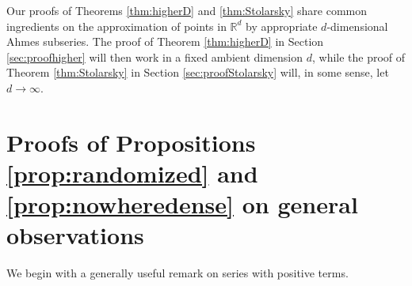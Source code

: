 \documentclass[11pt,letterpaper,reqno]{amsart}
\numberwithin{equation}{section}
\theoremstyle{definition}
\numberwithin{equation}{section}
\begin{document}
Our proofs of Theorems \ref{thm:higherD} and \ref{thm:Stolarsky} share common ingredients on the approximation of points in $\mathbb{R}^d$ by appropriate $d$-dimensional Ahmes subseries. The proof of Theorem \ref{thm:higherD} in Section \ref{sec:proofhigher} will then work in a fixed ambient dimension $d$, while the proof of Theorem \ref{thm:Stolarsky} in Section \ref{sec:proofStolarsky} will, in some sense, let $d\to\infty$.


\section{Proofs of Propositions \ref{prop:randomized} and \ref{prop:nowheredense} on general observations}
\label{sec:proofsgeneral}

We begin with a generally useful remark on series with positive terms.
\end{document}
